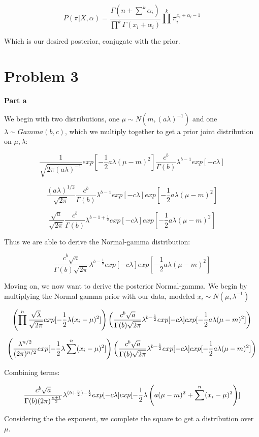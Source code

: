 \documentclass[twoside,11pt]{homework}
\begin{document}
\[
P(\pi | X, \alpha) = 
\frac{\Gamma(n + \sum^k \alpha_i)}{\prod^k \Gamma(x_i + \alpha_i)}
\prod^k \pi_i^{x_i + \alpha_i - 1}
\]

Which is our desired posterior, conjugate with the prior.

\section*{Problem 3}
\textbf{Part a}

We begin with two distributions, one $\mu \sim N(m, (a\lambda)^{-1})$ and one $\lambda \sim Gamma(b, c)$, which we multiply together to get a prior joint distribution on $\mu, \lambda$:

\[
\frac{1}{\sqrt{2\pi(a\lambda)^{-1}}}
exp[-\frac{1}{2}a\lambda(\mu - m)^2]
\frac{c^b}{\Gamma{(b)}}
\lambda^{b-1}
exp[-c\lambda]
\]

\[
\frac{(a\lambda)^{1/2}}{\sqrt{2\pi}}
\frac{c^b}{\Gamma{(b)}}
\lambda^{b-1}
exp[-c\lambda]
exp[-\frac{1}{2}a\lambda(\mu - m)^2]
\]

\[
\frac{\sqrt{a}}{\sqrt{2\pi}}
\frac{c^b}{\Gamma{(b)}}
\lambda^{b-1+\frac{1}{2}}
exp[-c\lambda]
exp[-\frac{1}{2}a\lambda(\mu - m)^2]
\]

Thus we are able to derive the Normal-gamma distribution:

\[
\frac{c^b\sqrt{a}}{\Gamma{(b)}\sqrt{2\pi}}
\lambda^{b-\frac{1}{2}}
exp[-c\lambda]
exp[-\frac{1}{2}a\lambda(\mu - m)^2]
\]

Moving on, we now want to derive the posterior Normal-gamma.
We begin by multiplying the Normal-gamma prior with our data, modeled $x_i \sim N(\mu, \lambda^{-1})$

\[
\left(
\prod^n
\frac{\sqrt{\lambda}}{\sqrt{2\pi}}
exp[-\frac{1}{2}\lambda(x_i - \mu)^2]
\right)
\left(
\frac{c^b\sqrt{a}}{\Gamma{(b)}\sqrt{2\pi}}
\lambda^{b-\frac{1}{2}}
exp[-c\lambda]
exp[-\frac{1}{2}a\lambda(\mu - m)^2]
\right)
\]

\[
\left(
\frac{\lambda^{n/2}}{(2\pi)^{n/2}}
exp[-\frac{1}{2}\lambda\sum^n(x_i - \mu)^2]
\right)
\left(
\frac{c^b\sqrt{a}}{\Gamma{(b)}\sqrt{2\pi}}
\lambda^{b-\frac{1}{2}}
exp[-c\lambda]
exp[-\frac{1}{2}a\lambda(\mu - m)^2]
\right)
\]

Combining terms:

\[
\frac{c^b\sqrt{a}}{\Gamma{(b)}(2\pi)^{\frac{n+1}{2}}}
\lambda^{(b+\frac{n}{2})-\frac{1}{2}}
exp[-c\lambda]
exp[-\frac{1}{2}\lambda
\left(a(\mu - m)^2 + \sum^n(x_i - \mu)^2\right)
]
\]

Considering the the exponent, we complete the square to get a distribution over $\mu$.
\end{document}
